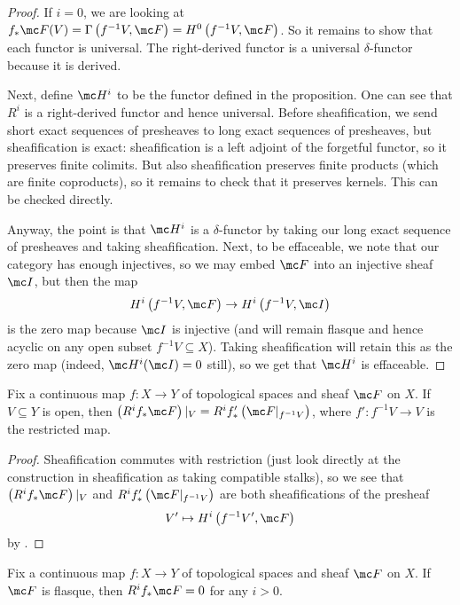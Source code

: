 \documentclass[../notes.tex]{subfiles}
\begin{document}
\begin{proof}
	If $i=0$, we are looking at $f_*\mc F(V)=\Gamma\left(f^{-1}V,\mc F\right)=H^0\left(f^{-1}V,\mc F\right)$. So it remains to show that each functor is universal. The right-derived functor is a universal $\delta$-functor because it is derived.

	Next, define $\mc H^i$ to be the functor defined in the proposition. One can see that $R^i$ is a right-derived functor and hence universal. Before sheafification, we send short exact sequences of presheaves to long exact sequences of presheaves, but sheafification is exact: sheafification is a left adjoint of the forgetful functor, so it preserves finite colimits. But also sheafification preserves finite products (which are finite coproducts), so it remains to check that it preserves kernels. This can be checked directly.
	
	Anyway, the point is that $\mc H^i$ is a $\delta$-functor by taking our long exact sequence of presheaves and taking sheafification. Next, to be effaceable, we note that our category has enough injectives, so we may embed $\mc F$ into an injective sheaf $\mc I$, but then the map
	\[H^i\left(f^{-1}V,\mc F\right)\to H^i\left(f^{-1}V,\mc I\right)\]
	is the zero map because $\mc I$ is injective (and will remain flasque and hence acyclic on any open subset $f^{-1}V\subseteq X$). Taking sheafification will retain this as the zero map (indeed, $\mc H^i(\mc I)=0$ still), so we get that $\mc H^i$ is effaceable.
\end{proof}
\begin{corollary} \label{cor:restrict-higher-direct-image}
	Fix a continuous map $f\colon X\to Y$ of topological spaces and sheaf $\mc F$ on $X$. If $V\subseteq Y$ is open, then $\left(R^if_*\mc F\right)|_V=R^if_*'\left(\mc F|_{f^{-1}V}\right)$, where $f'\colon f^{-1}V\to V$ is the restricted map.
\end{corollary}
\begin{proof}
	Sheafification commutes with restriction (just look directly at the construction in sheafification as taking compatible stalks), so we see that $\left(R^if_*\mc F\right)|_V$ and $R^if_*'\left(\mc F|_{f^{-1}V}\right)$ are both sheafifications of the presheaf
	\[V'\mapsto H^i\left(f^{-1}V',\mc F\right)\]
	by .
\end{proof}
\begin{corollary} \label{cor:flasque-is-acyclic-direct-image}
	Fix a continuous map $f\colon X\to Y$ of topological spaces and sheaf $\mc F$ on $X$. If $\mc F$ is flasque, then $R^if_*\mc F=0$ for any $i>0$.
\end{corollary}
\end{document}
